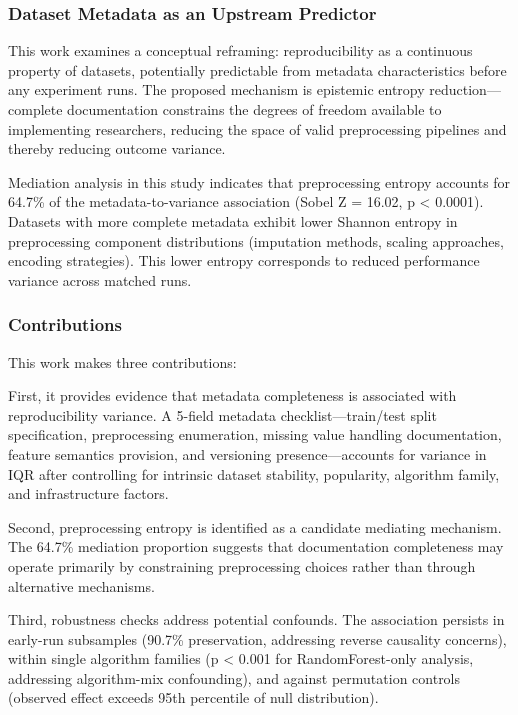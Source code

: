 \subsubsection{Dataset Metadata as an Upstream Predictor}

This work examines a conceptual reframing: reproducibility as a continuous property of datasets, potentially predictable from metadata characteristics before any experiment runs. The proposed mechanism is epistemic entropy reduction---complete documentation constrains the degrees of freedom available to implementing researchers, reducing the space of valid preprocessing pipelines and thereby reducing outcome variance.

Mediation analysis in this study indicates that preprocessing entropy accounts for 64.7\% of the metadata-to-variance association (Sobel Z = 16.02, p < 0.0001). Datasets with more complete metadata exhibit lower Shannon entropy in preprocessing component distributions (imputation methods, scaling approaches, encoding strategies). This lower entropy corresponds to reduced performance variance across matched runs.

\subsubsection{Contributions}

This work makes three contributions:

First, it provides evidence that metadata completeness is associated with reproducibility variance. A 5-field metadata checklist---train/test split specification, preprocessing enumeration, missing value handling documentation, feature semantics provision, and versioning presence---accounts for variance in IQR after controlling for intrinsic dataset stability, popularity, algorithm family, and infrastructure factors.

Second, preprocessing entropy is identified as a candidate mediating mechanism. The 64.7\% mediation proportion suggests that documentation completeness may operate primarily by constraining preprocessing choices rather than through alternative mechanisms.

Third, robustness checks address potential confounds. The association persists in early-run subsamples (90.7\% preservation, addressing reverse causality concerns), within single algorithm families (p < 0.001 for RandomForest-only analysis, addressing algorithm-mix confounding), and against permutation controls (observed effect exceeds 95th percentile of null distribution).


